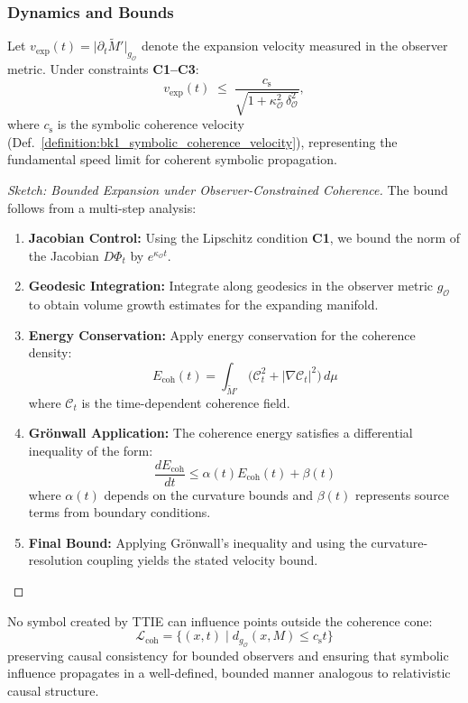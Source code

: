 \subsubsection{Dynamics and Bounds}
\begin{lemma}
\label{lemma:bk4_ttie_expansion_rate}
Let $v_{\text{exp}}(t)=\bigl|\partial_t\widetilde{M}'\bigr|_{g_{\mathcal{O}}}$ denote the expansion velocity measured in the observer metric. Under constraints \textbf{C1--C3}:
\[
v_{\text{exp}}(t)\;\le\;
\frac{c_{\text{s}}}{\sqrt{1+\kappa_{\mathcal{O}}^{2}\,\delta_{\mathcal{O}}^{2}}},
\]
where $c_{\text{s}}$ is the symbolic coherence velocity (Def.~\ref{definition:bk1_symbolic_coherence_velocity}), representing the fundamental speed limit for coherent symbolic propagation.
\end{lemma}

\begin{proof}[Sketch: Bounded Expansion under Observer-Constrained Coherence]
\label{proof:bk4_bounded_expansion_under_observer_constrained_coherence}
The bound follows from a multi-step analysis:
\begin{enumerate}
\item \textbf{Jacobian Control:} Using the Lipschitz condition \textbf{C1}, we bound the norm of the Jacobian $D\Phi_t$ by $e^{\kappa_{\mathcal{O}} t}$.
\item \textbf{Geodesic Integration:} Integrate along geodesics in the observer metric $g_{\mathcal{O}}$ to obtain volume growth estimates for the expanding manifold.
\item \textbf{Energy Conservation:} Apply energy conservation for the coherence density:
\[
E_{\text{coh}}(t)=\int_{\widetilde{M}'}\!
  \bigl(\mathcal{C}_t^{2}+|\nabla\mathcal{C}_t|^{2}\bigr)\,d\mu
\]
where $\mathcal{C}_t$ is the time-dependent coherence field.
\item \textbf{Grönwall Application:} The coherence energy satisfies a differential inequality of the form:
\[
\frac{dE_{\text{coh}}}{dt} \leq \alpha(t) E_{\text{coh}}(t) + \beta(t)
\]
where $\alpha(t)$ depends on the curvature bounds and $\beta(t)$ represents source terms from boundary conditions.
\item \textbf{Final Bound:} Applying Grönwall's inequality and using the curvature-resolution coupling yields the stated velocity bound. \qedhere
\end{enumerate}
\end{proof}

\begin{corollary}
\label{corollary:bk4_symbolic_lightcone}
No symbol created by TTIE can influence points outside the coherence cone:
\[
\mathcal{L}_{\text{coh}}\!=\!\{(x,t)\mid d_{g_{\mathcal{O}}}(x,M)\le c_{\text{s}}t\}
\]
preserving causal consistency for bounded observers and ensuring that symbolic influence propagates in a well-defined, bounded manner analogous to relativistic causal structure.
\end{corollary}

